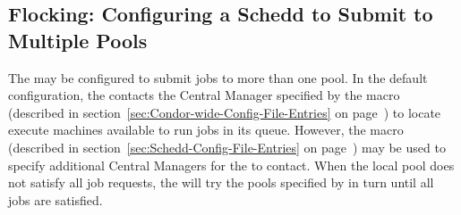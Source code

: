 \subsection{\label{sec:Flocking}
Flocking: Configuring a Schedd to Submit to Multiple Pools}

The  may be configured to submit jobs to more than one
pool.
In the default configuration, the  contacts the
Central Manager specified by the  macro (described
in section~\ref{sec:Condor-wide-Config-File-Entries} on
page~\pageref{sec:Condor-wide-Config-File-Entries})
to locate execute machines
available to run jobs in its queue.
However, the
 macro (described in
section~\ref{sec:Schedd-Config-File-Entries} on
page~\pageref{sec:Schedd-Config-File-Entries}) may 
be used to specify additional 
Central Managers for the  to contact.
When the local
pool does not satisfy all job requests, the  will try
the pools specified by  in turn until all jobs are
satisfied.
